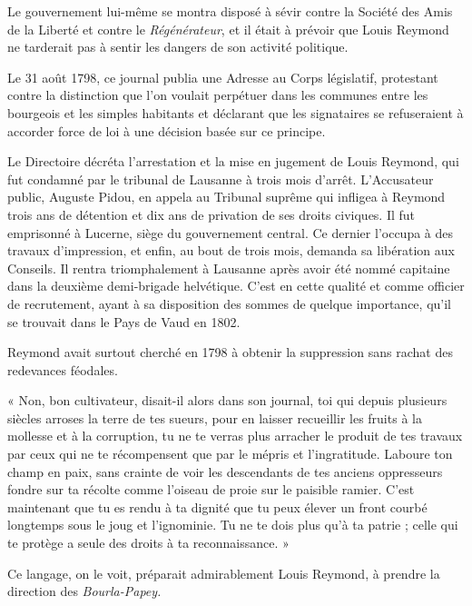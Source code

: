\documentclass[french,twoside]{book} %
\newenvironment{quoteblock}%
  {\begin{quoting}}
  {\end{quoting}}
\newenvironment{quotebar}{%
    \def\FrameCommand{{\color{rubric!10!}\vrule width 0.5em} \hspace{0.9em}}%
    \def\OuterFrameSep{\itemsep} %
    \MakeFramed {\advance\hsize-\width \FrameRestore}
  }%
  {%
    \endMakeFramed
  }
\renewenvironment{quoteblock}%
  {%
    \savenotes
    \setstretch{0.9}
    \begin{quotebar}
  }
  {%
    \end{quotebar}
    \spewnotes
  }
\begin{document}
\noindent Le gouvernement lui-même se montra disposé à sévir contre la Société des Amis de la Liberté et contre le \emph{Régénérateur}, et il était à prévoir que Louis Reymond ne tarderait pas à sentir les dangers de son activité politique.\par
Le 31 août 1798, ce journal publia une Adresse au Corps législatif, protestant contre la distinction que l’on voulait perpétuer dans les communes entre les bourgeois et les simples habitants et déclarant que les signataires se refuseraient à accorder force de loi à une décision basée sur ce principe.\par
Le Directoire décréta l’arrestation et la mise en jugement de Louis Reymond, qui fut condamné par le tribunal de Lausanne à trois mois d’arrêt. L’Accusateur public, Auguste Pidou, en appela au Tribunal suprême qui infligea à Reymond trois ans de détention et dix ans de privation de ses droits civiques. Il fut emprisonné à Lucerne, siège du gouvernement central. Ce dernier l’occupa à des travaux d’impression, et enfin, au bout de trois mois, demanda sa libération aux Conseils. Il rentra triomphalement à Lausanne après avoir été nommé capitaine dans la deuxième demi-brigade helvétique. C’est en cette qualité et comme officier de recrutement, ayant à sa disposition des sommes de quelque importance, qu’il se trouvait dans le Pays de Vaud en 1802.\par
Reymond avait surtout cherché en 1798 à obtenir la suppression sans rachat des redevances féodales.\par

\begin{quoteblock}
 \noindent « Non, bon cultivateur, disait-il alors dans son journal, toi qui depuis plusieurs siècles arroses la terre de tes sueurs, pour en laisser recueillir les fruits à la mollesse et à la corruption, tu ne te verras plus arracher le produit de tes travaux par ceux qui ne te récompensent que par le mépris et l’ingratitude. Laboure ton champ en paix, sans crainte de voir les descendants de tes anciens oppresseurs fondre sur ta récolte comme l’oiseau de proie sur le paisible ramier. C’est maintenant que tu es rendu à ta dignité que tu peux élever un front courbé longtemps sous le joug et l’ignominie. Tu ne te dois plus qu’à ta patrie ; celle qui te protège a seule des droits à ta reconnaissance. »
 \end{quoteblock}

\noindent Ce langage, on le voit, préparait admirablement Louis Reymond, à prendre la direction des \emph{Bourla-Papey.}
\end{document}
